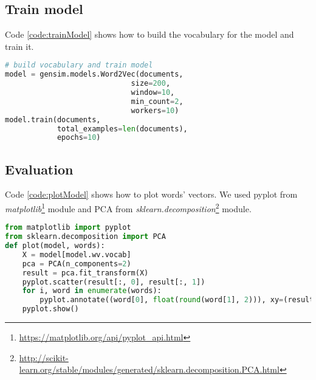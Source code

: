 \subsection{Train model}
\label{appendix:trainModel}
\begin{minipage}{\linewidth}
Code \ref{code:trainModel} shows how to build the vocabulary for the model and train it.
\begin{lstlisting}[caption={How to build vocabulary and train model}, label={code:trainModel}, language=Python, breaklines=true, frame=single] 
# build vocabulary and train model
model = gensim.models.Word2Vec(documents,
                             size=200,
                             window=10,
                             min_count=2,
                             workers=10)
model.train(documents, 
            total_examples=len(documents),
            epochs=10)
\end{lstlisting}
\end{minipage}

\subsection{Evaluation}
\label{appendix:plotModel}
Code \ref{code:plotModel} shows how to plot words' vectors. We used pyplot from \textit{matplotlib}\footnote{\url{https://matplotlib.org/api/pyplot_api.html}} module and PCA from \textit{sklearn.decomposition}\footnote{\url{http://scikit-learn.org/stable/modules/generated/sklearn.decomposition.PCA.html}} module.
\begin{lstlisting}[caption={How to plot words' vectors}, label={code:plotModel}, language=Python, breaklines=true, frame=single] 
from matplotlib import pyplot
from sklearn.decomposition import PCA
def plot(model, words):
	X = model[model.wv.vocab]
	pca = PCA(n_components=2)
	result = pca.fit_transform(X)
	pyplot.scatter(result[:, 0], result[:, 1])
	for i, word in enumerate(words):
		pyplot.annotate((word[0], float(round(word[1], 2))), xy=(result[i, 0], result[i, 1]))
	pyplot.show()
\end{lstlisting}


\listoffigures
\listoftables

